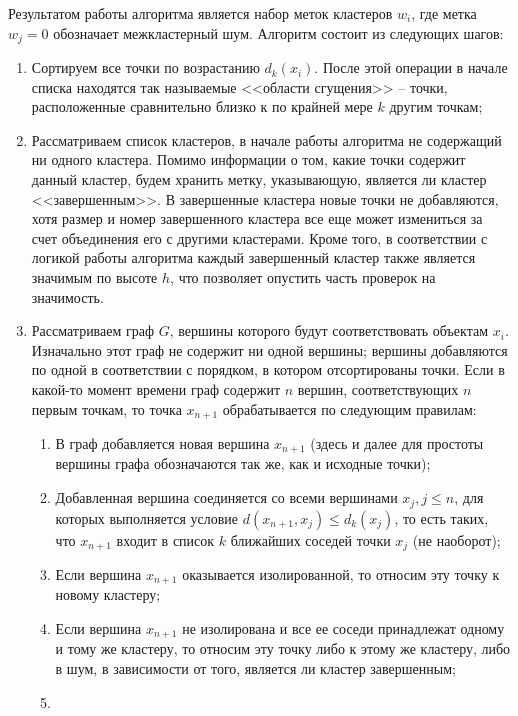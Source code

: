 Результатом работы алгоритма является набор меток кластеров $w_i$, где метка $w_j = 0$ обозначает межкластерный шум. Алгоритм состоит из следующих шагов:
\begin{enumerate}
\item
    Сортируем все точки по возрастанию $d_k(x_i)$. После этой операции в начале списка находятся так называемые <<области сгущения>> -- точки, расположенные сравнительно близко к по крайней мере $k$ другим точкам;
\item
    Рассматриваем список кластеров, в начале работы алгоритма не содержащий ни одного кластера.
    Помимо информации о том, какие точки содержит данный кластер, будем хранить метку, указывающую, является ли кластер <<завершенным>>.
    В завершенные кластера новые точки не добавляются, хотя размер и номер завершенного кластера все еще может измениться за счет объединения его с другими кластерами.
    Кроме того, в соответствии с логикой работы алгоритма каждый завершенный кластер также является значимым по высоте $h$, что позволяет опустить часть проверок на значимость.
\item
    Рассматриваем граф $G$, вершины которого будут соответствовать объектам $x_i$.
    Изначально этот граф не содержит ни одной вершины; вершины добавляются по одной в соответствии с порядком, в котором отсортированы точки.
    Если в какой-то момент времени граф содержит $n$ вершин, соответствующих $n$ первым точкам, то точка $x_{n+1}$ обрабатывается по следующим правилам:
    \begin{enumerate}
    \item
        В граф добавляется новая вершина $x_{n+1}$ (здесь и далее для простоты вершины графа обозначаются так же, как и исходные точки);
    \item
        Добавленная вершина соединяется со всеми вершинами $x_{j}, j \leq n$, для которых выполняется условие $d\left( x_{n+1}, x_j \right) \leq d_k\left( x_j \right)$, то есть таких, что $x_{n+1}$ входит в список $k$ ближайших соседей точки $x_j$ (не наоборот);
    \item
        Если вершина $x_{n+1}$ оказывается изолированной, то относим эту точку к новому кластеру;
    \item
        Если вершина $x_{n+1}$ не изолирована и все ее соседи принадлежат одному и тому же кластеру, то относим эту точку либо к этому же кластеру, либо в шум, в зависимости от того, является ли кластер завершенным;
    \item

\end{enumerate}
\end{enumerate}
